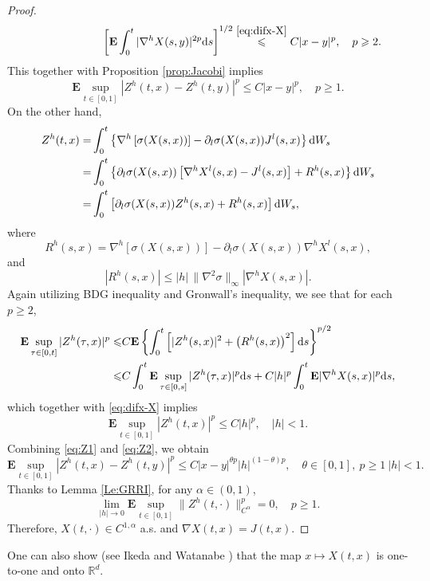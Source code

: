 \documentclass[twoside, 12pt]{book}
\numberwithin{equation}{chapter}
\def\mR{{\mathbb R}}
\def\bE{{\mathbf E}}
\def\geq{\geqslant}
\def\leq{\leqslant}
\def\d{\text{\rm{d}}}
\begin{document}
\begin{proof}
\[\begin{aligned}
       &\qquad\qquad\qquad\quad \left[ \bE\int_0^t|\nabla^{h}X(s,y)|^{2p} \d s \right]^{1/2} \overset{\eqref{eq:difx-X}}{\leq} C |x-y|^p, \quad p\geq 2. 
   \end{aligned}
   \]
   This together with Proposition \ref{prop:Jacobi} implies 
   \begin{equation}\label{eq:Z1}
       \bE\sup_{t\in[0,1]}|Z^h(t,x)-Z^h(t,y)|^p\leq C |x-y|^p, \quad p\geq 1. 
   \end{equation}
    On the other hand, 
    \begin{equation*}
    \begin{aligned}
        Z^h(t,x)=&\int_0^t \left\{ \nabla^{h}\left[\sigma(X(s,x))\right]-\partial_l \sigma(X(s,x))J^l(s,x)\right\} \d W_s\\
        =& \int_0^t \left\{\partial_l \sigma(X(s,x)) \left[\nabla^{h} X^l(s,x)-J^l(s,x)\right]+R^h(s,x) \right\} \d W_s\\
       =&\int_0^t \left[\partial_l \sigma(X(s,x)) Z^h(s,x)+R^h(s,x) \right] \d W_s, 
    \end{aligned}    
    \end{equation*}
    where 
    \[
        R^h(s,x)= \nabla^{h}\left[\sigma(X(s,x))\right]-\partial_l \sigma(X(s,x)) \nabla^{h} X^l(s,x), 
    \]
    and 
    \[
         |R^h(s,x)|\leq |h|\,\|\nabla^2\sigma\|_\infty |\nabla^{h}X(s,x)|. 
    \]
    Again utilizing BDG inequality and Gronwall's inequality, we see that for each $p\geq 2$, 
    \begin{equation*}
    \begin{aligned}
        \bE \sup_{\tau\in [0,t]}|Z^h(\tau,x)|^p \leq& C \bE \left\{ \int_0^t \left[|Z^h(s,x)|^2+\left(R^h(s,x)\right)^2\right] \d s \right\}^{p/2}\\
        \leq&C \int_0^t \bE \sup_{\tau\in [0,s]}|Z^h(\tau,x)|^p \d s + C |h|^p \int_0^t\bE |\nabla^{h}X(s,x)|^p \d s,
    \end{aligned}     
    \end{equation*}
    which together with \eqref{eq:difx-X} implies 
    \begin{equation}\label{eq:Z2}
        \bE \sup_{t\in [0,1]}|Z^h(t,x)|^p \leq C |h|^p, \quad |h|<1. 
    \end{equation}
    Combining \eqref{eq:Z1} and \eqref{eq:Z2}, we obtain 
    \begin{equation*}
        \bE\sup_{t\in[0,1]}|Z^h(t,x)-Z^h(t,y)|^p\leq C |x-y|^{\theta p}|h|^{(1-\theta)p}, \quad \theta\in [0,1], ~ p\geq 1~|h|<1. 
    \end{equation*}
    Thanks to Lemma \eqref{Le:GRRI}, for any $\alpha\in (0,1)$, 
    \begin{equation*}
        \lim_{|h|\to 0}\bE \sup_{t\in[0,1]}\|Z^h(t,\cdot)\|_{C^{\alpha}}^p=0, \quad p\geq 1. 
    \end{equation*}
    Therefore, $X(t,\cdot)\in C^{1,\alpha}$ a.s. and $\nabla X(t,x)=J(t,x)$. 
    \end{proof}
    One can also show (see Ikeda and Watanabe \cite{ikeda2014stochastic}) that the map $x\mapsto X(t,x)$ is one-to-one and onto $\mR^d$. 
\end{document}
